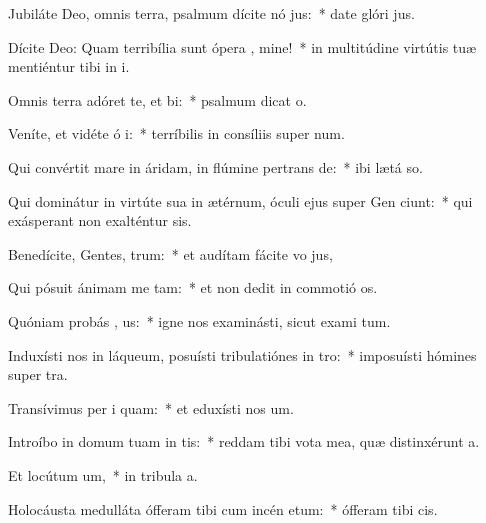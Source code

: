 \item Jubiláte Deo, omnis terra, psalmum dícite nó jus:~* date glóri  jus.
\item Dícite Deo: Quam terribília sunt ópera , mine!~* in multitúdine virtútis tuæ mentiéntur tibi in i.
\item Omnis terra adóret te, et  bi:~* psalmum dicat  o.
\item Veníte, et vidéte ó i:~* terríbilis in consíliis super  num.
\item Qui convértit mare in áridam, in flúmine pertrans de:~* ibi lætá  so.
\item Qui dominátur in virtúte sua in ætérnum, óculi ejus super Gen ciunt:~* qui exásperant non exalténtur  sis.
\item Benedícite, Gentes,  trum:~* et audítam fácite vo  jus,
\item Qui pósuit ánimam me  tam:~* et non dedit in commotió  os.
\item Quóniam probás , us:~* igne nos examinásti, sicut exami tum.
\item Induxísti nos in láqueum, posuísti tribulatiónes in  tro:~* imposuísti hómines super  tra.
\item Transívimus per i  quam:~* et eduxísti nos  um.
\item Introíbo in domum tuam in tis:~* reddam tibi vota mea, quæ distinxérunt  a.
\item Et locútum   um,~* in tribula a.
\item Holocáusta medulláta ófferam tibi cum incén etum:~* ófferam tibi   cis.
